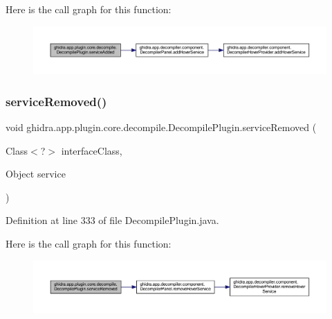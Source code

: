 Here is the call graph for this function\+:
\nopagebreak
\begin{figure}[H]
\begin{center}
\leavevmode
\includegraphics[width=350pt]{classghidra_1_1app_1_1plugin_1_1core_1_1decompile_1_1_decompile_plugin_aed00c4c6a2838059ff1ba5cf77ddf187_cgraph}
\end{center}
\end{figure}
\mbox{\label{classghidra_1_1app_1_1plugin_1_1core_1_1decompile_1_1_decompile_plugin_a39d836be685ba7271ce9828d7439a98e}} 
\subsubsection{\texorpdfstring{serviceRemoved()}{serviceRemoved()}}
{\footnotesize\ttfamily void ghidra.\+app.\+plugin.\+core.\+decompile.\+Decompile\+Plugin.\+service\+Removed (\begin{DoxyParamCaption}\item[{Class$<$?$>$}]{interface\+Class,  }\item[{Object}]{service }\end{DoxyParamCaption})\hspace{0.3cm}{\ttfamily [inline]}}



Definition at line 333 of file Decompile\+Plugin.\+java.

Here is the call graph for this function\+:
\nopagebreak
\begin{figure}[H]
\begin{center}
\leavevmode
\includegraphics[width=350pt]{classghidra_1_1app_1_1plugin_1_1core_1_1decompile_1_1_decompile_plugin_a39d836be685ba7271ce9828d7439a98e_cgraph}
\end{center}
\end{figure}
\mbox{\label{classghidra_1_1app_1_1plugin_1_1core_1_1decompile_1_1_decompile_plugin_a7f6e36998681226e7abe9ed2debc58a6}} 
